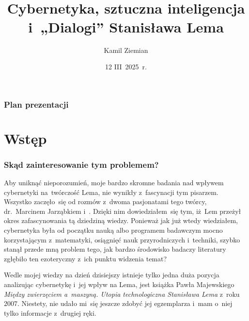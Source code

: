 \documentclass[10pt,t]{beamer}
\title{Cybernetyka, sztuczna inteligencja i~„Dialogi”
  Stanisława Lema}
\author{Kamil Ziemian \\
  \email}
\date[12 III~2025~r.]{12 III~2025~r.}
\begin{document}





\RaggedRight





\maketitle





\begin{frame}
  \frametitle{Plan prezentacji}


  \tableofcontents

\end{frame}










\section{Wstęp}



\begin{frame}
  \frametitle{Skąd zainteresowanie tym problemem?}


  Aby uniknąć nieporozumień, moje bardzo skromne badania nad wpływem
  cybernetyki na~twórczość Lema, nie wynikły z~fascynacji tym pisarzem.
  Wszystko zaczęło~się od rozmów z~dwoma pasjonatami tego twórcy,
  {dr.~Marcinem Jarząbkiem}
  i~. Dzięki nim dowiedziałem~się tym, iż~Lem przeżył
  okres zafascynowania tą dziedziną wiedzy. Ponieważ jak już wtedy
  wiedziałem, cybernetyka była od początku nauką albo programem badawczym
  mocno korzystającym z~matematyki, osiągnięć nauk przyrodniczych
  i~techniki, szybko stanął przede mną problem tego, jak bardzo środowisko
  badaczy literatury zgłębiło ten ezoteryczny z~ich punktu widzenia temat?

  Wedle mojej wiedzy na dzień dzisiejszy istnieje tylko jedna duża pozycja
  analizując cybernetykę i~jej wpływ na Lema, jest książka Pawła Majewskiego
  \textit{Między zwierzęciem a~maszyną. Utopia technologiczna Stanisława
    Lema} z~roku~$2007$. Niestety, nie udało mi~się jeszcze zdobyć jej
  egzemplarza i~mam o~niej tylko informacje z~drugiej ręki.

\end{frame}
\end{document}
